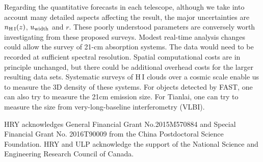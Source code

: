 \documentclass[]{raa}
\newcommand{\HI}{{H{\small\,I}}}
\begin{document}
Regarding the quantitative forecasts in each telescope, although we take
into account many detailed aspects affecting the result, the major
uncertainties are $n_{\rm \HI}(z)$, $u_{\rm width}$ and $r$.
These poorly understood parameters are conversely worth investigating
from these proposed surveys. Modest real-time analysis changes could
allow the survey of 21-cm absorption systems. The data would need to be
recorded at sufficient spectral resolution. Spatial computational costs are
in principle unchanged, but there could be additional overhead
costs for the larger resulting data sets. Systematic surveys of
{\HI} clouds over a cosmic scale enable us to measure the 3D density
of these systems. For objects detected by FAST, one can also try to measure
the 21cm emission size. For Tianlai, one can try to measure the size from
very-long-baseline interferometry (VLBI).


\begin{acknowledgements}
HRY acknowledges General Financial Grant No.2015M570884 and
Special Financial Grant No. 2016T90009 from the China
Postdoctoral Science Foundation.
HRY and ULP acknowledge the support of the
National Science and Engineering Research Council of Canada.
\end{acknowledgements}



\end{document}
